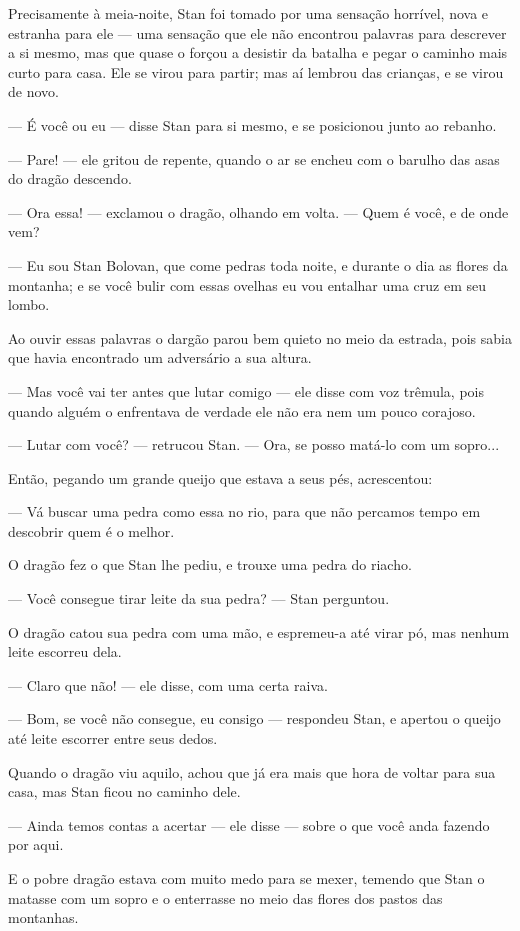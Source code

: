 Precisamente à meia-noite, Stan foi tomado por uma sensação horrível,
nova e estranha para ele — uma sensação que ele não encontrou
palavras para descrever a si mesmo, mas que quase o forçou a desistir
da batalha e pegar o caminho mais curto para casa. Ele se virou para
partir; mas aí lembrou das crianças, e se virou de novo.

— É você ou eu — disse Stan para si mesmo, e se posicionou junto ao
rebanho.

— Pare! — ele gritou de repente, quando o ar se encheu com o barulho
das asas do dragão descendo.

— Ora essa! — exclamou o dragão, olhando em volta. — Quem é você, e de
onde vem? 

— Eu sou Stan Bolovan, que come pedras toda noite, e durante o dia as
flores da montanha; e se você bulir com essas ovelhas eu vou entalhar
uma cruz em seu lombo.

Ao ouvir essas palavras o dargão parou bem quieto no meio da estrada,
pois sabia que havia encontrado um adversário a sua altura.

— Mas você vai ter antes que lutar comigo — ele disse com voz trêmula,
pois quando alguém o enfrentava de verdade ele não era nem um pouco
corajoso.

— Lutar com você? — retrucou Stan. — Ora, se posso matá-lo com um
sopro...

Então, pegando um grande queijo que estava a seus pés, acrescentou:

— Vá buscar uma pedra como essa no rio, para que não percamos tempo em
descobrir quem é o melhor.

O dragão fez o que Stan lhe pediu, e trouxe uma pedra do riacho.

— Você consegue tirar leite da sua pedra? — Stan perguntou.

O dragão catou sua pedra com uma mão, e espremeu-a até virar pó, mas
nenhum leite escorreu dela.

— Claro que não! — ele disse, com uma certa raiva.

— Bom, se você não consegue, eu consigo — respondeu Stan, e apertou o
queijo até leite escorrer entre seus dedos.

Quando o dragão viu aquilo, achou que já era mais que hora de voltar
para sua casa, mas Stan ficou no caminho dele.

— Ainda temos contas a acertar — ele disse — sobre o que você anda
fazendo por aqui.

E o pobre dragão estava com muito medo para se mexer, temendo que Stan
o matasse com um sopro e o enterrasse no meio das flores dos pastos
das montanhas.

